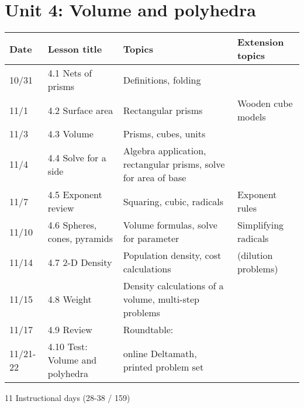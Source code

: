 \section*{Unit 4: Volume and polyhedra}
\begin{tabular}{|p{0.9cm}|p{4cm}|p{7cm}|p{5cm}|}
  \hline
  Date & Lesson title & Topics  & Extension topics \\
  \hline
  10/31 & 4.1 Nets of prisms & Definitions, folding &  \\
  \hline
  11/1 & 4.2 Surface area & Rectangular prisms & Wooden cube models \\
  \hline
  11/3 & 4.3 Volume & Prisms, cubes, units &  \\
  \hline
  11/4 & 4.4 Solve for a side & Algebra application, rectangular prisms, solve for area of base &  \\
  \hline
  11/7 & 4.5 Exponent review & Squaring, cubic, radicals & Exponent rules \\
  \hline
  11/10 & 4.6 Spheres, cones, pyramids & Volume formulas, solve for parameter & Simplifying radicals \\
  \hline
  11/14 & 4.7 2-D Density & Population density, cost calculations & (dilution problems) \\
  \hline
  11/15 & 4.8 Weight & Density calculations of a volume, multi-step problems & \\
  \hline
  11/17 & 4.9 Review & Roundtable: &  \\
  \hline
  11/21-22 & 4.10 Test: Volume and polyhedra & online Deltamath, printed problem set &  \\
  \hline

\end{tabular} \par \vspace*{0.3cm}
11 Instructional days (28-38 / 159)


